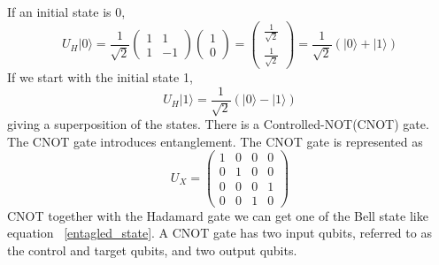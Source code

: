 \documentclass{Assignment}
\begin{document}
If an initial state is 0, 
\begin{equation}
U_H|0\rangle = \frac{1}{\sqrt{2}}
\begin{pmatrix}
	1&1\\1&-1
\end{pmatrix}\begin{pmatrix}
1\\0
\end{pmatrix}=\begin{pmatrix}
\frac{1}{\sqrt{2}}\\
\frac{1}{\sqrt{2}}
\end{pmatrix}=\frac{1}{\sqrt{2}}(|0 \rangle + |1\rangle)
\end{equation} 
If we start with the initial state 1,
$$U_H|1\rangle = \frac{1}{\sqrt{2}}(|0 \rangle - |1\rangle)$$
giving a superposition of the states.
There is a Controlled-NOT(CNOT) gate.
\\
The CNOT gate introduces entanglement.
The CNOT gate is represented as 
\begin{equation}
	U_X = \begin{pmatrix}
		1&0&0&0\\
		0&1&0&0\\
		0&0&0&1\\
		0&0&1&0
	\end{pmatrix}
\end{equation}
CNOT together with the Hadamard gate we can get one of the Bell state like equation ~\ref{entagled_state}.
A CNOT gate has two input qubits, referred to as the control and target qubits, and two output qubits. \cite{mcintyre_quantum_2012}
\end{document}
